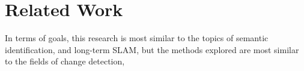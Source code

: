 \section{Related Work}
\label{sec:related_work}

In terms of goals, this research is most similar to the topics of semantic identification, and long-term SLAM, but the methods explored are most similar to the fields of change detection, 

% 